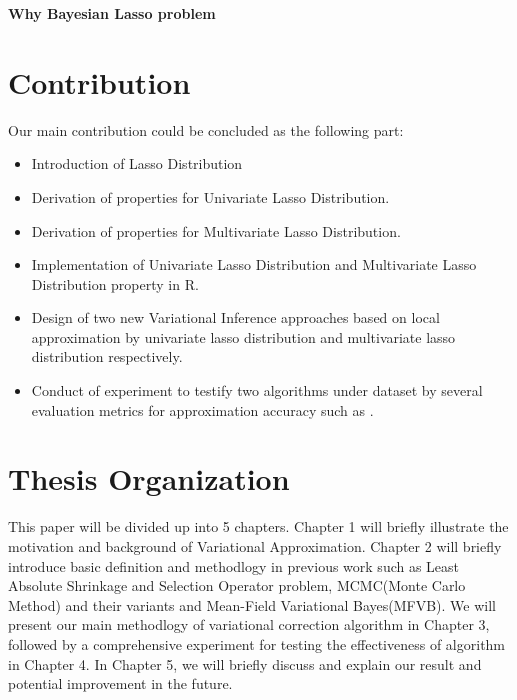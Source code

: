 \textbf{Why Bayesian Lasso problem}


\section{Contribution}
\label{cont}
Our main contribution could be concluded as the following part:
\begin{itemize}
	\item Introduction of Lasso Distribution
	\item Derivation of properties for Univariate Lasso Distribution.
	\item Derivation of properties for Multivariate Lasso Distribution.
	\item Implementation of Univariate Lasso Distribution and Multivariate Lasso Distribution property in R.
	\item Design of two new Variational Inference approaches based on local approximation by univariate lasso distribution and multivariate lasso distribution respectively.
	\item Conduct of experiment to testify two algorithms under  dataset by several evaluation metrics for approximation accuracy such as .
\end{itemize}



\section{Thesis Organization}
This paper will be divided up into 5 chapters. Chapter 1 will briefly illustrate the motivation and background of Variational Approximation. Chapter 2 will briefly introduce basic definition and methodlogy in previous work such as Least Absolute Shrinkage and Selection Operator problem, MCMC(Monte Carlo Method) and their variants and Mean-Field Variational Bayes(MFVB). We will present our main methodlogy of variational correction algorithm in Chapter 3, followed by a comprehensive experiment for testing the effectiveness of algorithm in Chapter 4. In Chapter 5, we will briefly discuss and explain our result and potential improvement in the future. 



 
